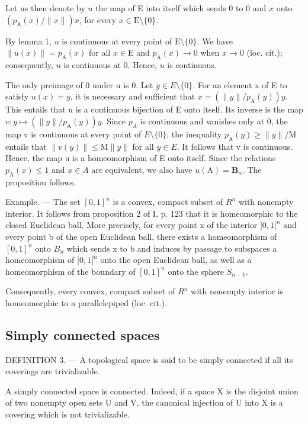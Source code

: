 Let us then denote by \(u\) the map of E into itself which sends 0 to 0 and \(x\) onto \((p_{\mathrm{A}}(x) / \| x\|)x\), for every \(x \in \mathrm{E}\setminus\{0\}\).

By lemma 1, \(u\) is continuous at every point of \(\mathrm{E}\setminus\{0\}\). We have \(\| u(x)\| = p_{\mathrm{A}}(x)\) for all \(x\in \mathrm{E}\) and \(p_{\mathrm{A}}(x)\to 0\) when \(x\to 0\) (loc. cit.); consequently, \(u\) is continuous at 0. Hence, \(u\) is continuous.

The only preimage of 0 under u is 0. Let \(y \in E\setminus\{0\}\). For an element x of E to satisfy \(u(x) = y\), it is necessary and sufficient that \(x = (\|y\| / p_{\mathrm{A}}(y))y\). This entails that u is a continuous bijection of E onto itself. Its inverse is the map \(v: y \mapsto (\|y\| / p_{\mathrm{A}}(y))y\). Since \(p_{A}\) is continuous and vanishes only at 0, the map v is continuous at every point of \(E\setminus\{0\}\); the inequality \(p_{\mathrm{A}}(y) \geqslant \|y\| / \mathrm{M}\) entails that \(\|v(y)\| \leqslant \mathrm{M}\|y\|\) for all \(y \in E\). It follows that v is continuous. Hence, the map u is a homeomorphism of E onto itself. Since the relations \(p_{\mathrm{A}}(x) \leqslant 1\) and \(x \in A\) are equivalent, we also have \(u(\mathrm{A}) = \mathbf{B}_{n}\). The proposition follows.

Example. --- The set \([0,1]^{n}\) is a convex, compact subset of \(R^{n}\) with nonempty interior. It follows from proposition 2 of I, p. 123 that it is homeomorphic to the closed Euclidean ball. More precisely, for every point x of the interior \(]0,1[^{n}\) and every point b of the open Euclidean ball, there exists a homeomorphism of \([0,1]^{n}\) onto \(B_{n}\) which sends x to b and induces by passage to subspaces a homeomorphism of \(]0,1[^{n}\) onto the open Euclidean ball, as well as a homeomorphism of the boundary of \([0,1]^{n}\) onto the sphere \(S_{n-1}\).

Consequently, every convex, compact subset of \(R^{n}\) with nonempty interior is homeomorphic to a parallelepiped (loc. cit.).

\subsection{Simply connected spaces}

DEFINITION 3. --- A topological space is said to be simply connected if all its coverings are trivializable.

A simply connected space is connected. Indeed, if a space X is the disjoint union of two nonempty open sets U and V, the canonical injection of U into X is a covering which is not trivializable.

